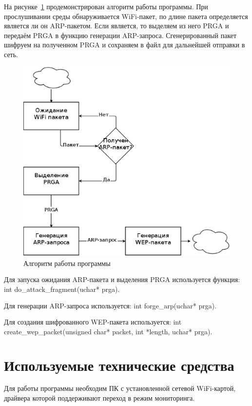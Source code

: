 На рисунке~\ref{fig:fragment_program_algo} продемонстрирован алгоритм работы
программы. При прослушивании среды обнаруживается WiFi-пакет, по длине пакета
определяется является ли он ARP-пакетом. Если является, то выделяем из него PRGA
и передаём PRGA в функцию генерации ARP-запроса. Сгенерированный пакет шифруем
на полученном PRGA и сохраняем в файл для дальнейшей отправки в сеть.

\begin{figure}
    \includegraphics[width=1\textwidth]{graphics/fragment_program_algo.eps}
    \caption{Алгоритм работы программы}
    \label{fig:fragment_program_algo}
\end{figure}

Для запуска ожидания ARP-пакета и выделения PRGA используется функция:
int do\_attack\_fragment(uchar* prga).

Для генерации ARP-запроса используется:
int forge\_arp(uchar* prga).

Для создания шифрованного WEP-пакета используется:
int create\_wep\_packet(unsigned char* packet, int *length, uchar* prga).

\section{Используемые технические средства}

Для работы программы необходим ПК с установленной сетевой WiFi-картой, драйвера
которой поддерживают переход в режим мониторинга.

